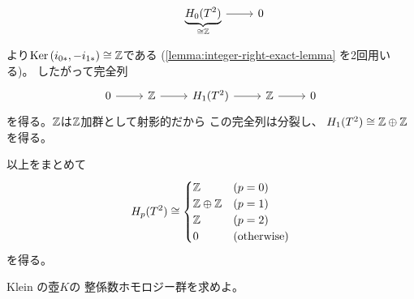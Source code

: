 \documentclass[report]{jlreq}
\begin{document}
\begin{answer}
\begin{equation}
\begin{tikzcd}
                & \underbrace{H_0(T^2)}_{\substack{
                    \cong \Z
                }}
                    \ar{r}
                & 0
        \end{tikzcd}
    \end{equation}
    より$\operatorname{\mathrm{Ker}} \, (i_{0*}, -i_{1*}) \cong \mathbb{Z}$である
    (\cref{lemma:integer-right-exact-lemma} を2回用いる)。
    したがって完全列
    \begin{equation}
        \begin{tikzcd}
            0 \ar{r}
                & \Z \ar{r}
                & H_1(T^2) \ar{r}
                & \Z \ar{r}
                & 0
        \end{tikzcd}
    \end{equation}
    を得る。$\mathbb{Z}$は$\mathbb{Z}$加群として射影的だから
    この完全列は分裂し、
    $H_1(T^2) \cong \mathbb{Z} \oplus \mathbb{Z}$を得る。

    以上をまとめて
    \begin{equation}
        H_p(T^2) \cong \begin{cases}
            \mathbb{Z} & (p = 0) \\
            \mathbb{Z} \oplus \mathbb{Z} & (p = 1) \\
            \mathbb{Z} & (p = 2) \\
            0 & (\text{otherwise})
        \end{cases}
    \end{equation}
    を得る。
\end{answer}

\begin{problem}
    Klein の壺$K$の
    整係数ホモロジー群を求めよ。
\end{problem}
\end{document}
